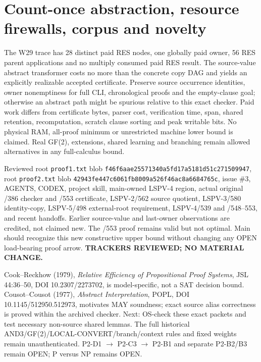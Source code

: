 \documentclass[11pt]{article}
\begin{document}
\section*{Count-once abstraction, resource firewalls, corpus and novelty}
The W29 trace has 28 distinct paid RES nodes, one globally paid owner, 56 RES parent applications and no multiply consumed paid RES result. The source-value abstract transformer costs no more than the concrete copy DAG and yields an explicitly realizable accepted certificate. Preserve source occurrence identities, owner nonemptiness for full CLI, chronological proofs and the empty-clause goal; otherwise an abstract path might be spurious relative to this exact checker. Paid work differs from certificate bytes, parser cost, verification time, span, shared retention, recomputation, scratch clause sorting and peak writable bits. No physical RAM, all-proof minimum or unrestricted machine lower bound is claimed. Real GF(2), extensions, shared learning and branching remain allowed alternatives in any full-calculus bound.

Reviewed root \texttt{proof1.txt} blob \texttt{f46f6aae25571340a5fd17a5181d51c271509947}, root \texttt{proof2.txt} blob \texttt{42943fe447c6061fb8009a526f46ac8a6684765c}, issue \#3, AGENTS, CODEX, project skill, main-owned LSPV-4 region, actual original /386 checker and /553 certificate, LSPV-2/562 source quotient, LSPV-3/580 identity-copy, LSPV-5/498 external-root requirement, LSPV-4/539 and /548--553, and recent handoffs. Earlier source-value and last-owner observations are credited, not claimed new. The /553 proof remains valid but not optimal. Main should recognize this new constructive upper bound without changing any OPEN load-bearing proof arrow. \textbf{TRACKERS REVIEWED; NO MATERIAL CHANGE.}

Cook--Reckhow (1979), \emph{Relative Efficiency of Propositional Proof Systems}, JSL 44:36--50, DOI 10.2307/2273702, is model-specific, not a SAT decision bound. Cousot--Cousot (1977), \emph{Abstract Interpretation}, POPL, DOI 10.1145/512950.512973, motivates MAY soundness; exact source alias correctness is proved within the archived checker. Next: OS-check these exact packets and test necessary non-source shared lemmas. The full historical AND3/GF(2)/LOCAL-CONVERT/branch/context rules and fixed weights remain unauthenticated. P2-D1 $\to$ P2-C3 $\to$ P2-B1 and separate P2-B2/B3 remain OPEN; P versus NP remains OPEN.
\end{document}
